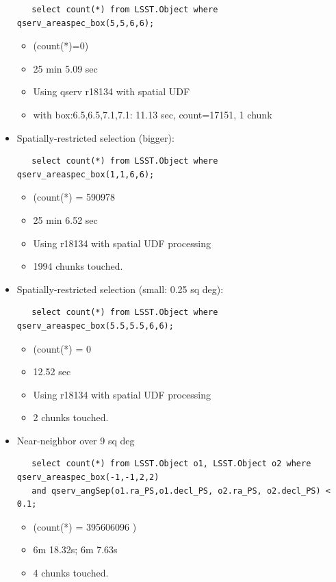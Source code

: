 \documentclass[DM,toc]{lsstdoc}
\begin{document}
\begin{itemize}
\begin{verbatim}
   select count(*) from LSST.Object where qserv_areaspec_box(5,5,6,6);
\end{verbatim}

  \begin{itemize}
  \item
    (count(*)=0)
  \item
    25 min 5.09 sec
  \item
    Using qserv r18134 with spatial UDF
  \item
    with box:6.5,6.5,7.1,7.1: 11.13 sec, count=17151, 1 chunk
  \end{itemize}
\item
  Spatially-restricted selection (bigger):

\begin{verbatim}
   select count(*) from LSST.Object where qserv_areaspec_box(1,1,6,6);
\end{verbatim}

  \begin{itemize}
  \item
    (count(*) = 590978
  \item
    25 min 6.52 sec
  \item
    Using r18134 with spatial UDF processing
  \item
    1994 chunks touched.
  \end{itemize}
\item
  Spatially-restricted selection (small: 0.25 sq deg):

\begin{verbatim}
   select count(*) from LSST.Object where qserv_areaspec_box(5.5,5.5,6,6);
\end{verbatim}

  \begin{itemize}
  \item
    (count(*) = 0
  \item
    12.52 sec
  \item
    Using r18134 with spatial UDF processing
  \item
    2 chunks touched.
  \end{itemize}
\item
  Near-neighbor over 9 sq deg

\begin{verbatim}
   select count(*) from LSST.Object o1, LSST.Object o2 where qserv_areaspec_box(-1,-1,2,2)
   and qserv_angSep(o1.ra_PS,o1.decl_PS, o2.ra_PS, o2.decl_PS) < 0.1;
\end{verbatim}

  \begin{itemize}
  \item
    (count(*) = 395606096 )
  \item
    6m 18.32s; 6m 7.63s
  \item
    4 chunks touched.
  \end{itemize}
\end{itemize}
\end{document}
